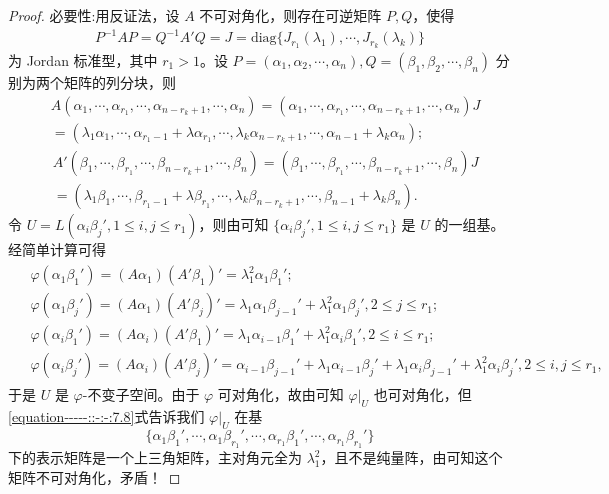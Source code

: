 \documentclass[../../main.tex]{subfiles}%
\begin{document}
\begin{proof}
{\heiti 必要性:}用反证法，设 $A$ 不可对角化，则存在可逆矩阵 $P,Q$，使得
\begin{align*}
P^{-1}AP = Q^{-1}A'Q = J = \mathrm{diag}\{J_{r_1}(\lambda_1),\cdots,J_{r_k}(\lambda_k)\}
\end{align*}
为 Jordan 标准型，其中 $r_1 > 1$。设 $P = (\alpha_1,\alpha_2,\cdots,\alpha_n),Q = (\beta_1,\beta_2,\cdots,\beta_n)$ 分别为两个矩阵的列分块，则
\begin{align*}
&A\left( \alpha _1,\cdots ,\alpha _{r_1},\cdots ,\alpha _{n-r_k+1},\cdots ,\alpha _n \right) =\left( \alpha _1,\cdots ,\alpha _{r_1},\cdots ,\alpha _{n-r_k+1},\cdots ,\alpha _n \right) J
\\
&=\left( \lambda _1\alpha _1,\cdots ,\alpha _{r_1-1}+\lambda \alpha _{r_1},\cdots ,\lambda _k\alpha _{n-r_k+1},\cdots ,\alpha _{n-1}+\lambda _k\alpha _n \right) ;
\end{align*}
\begin{align*}
&A'\left( \beta _1,\cdots ,\beta _{r_1},\cdots ,\beta _{n-r_k+1},\cdots ,\beta _n \right) =\left( \beta _1,\cdots ,\beta _{r_1},\cdots ,\beta _{n-r_k+1},\cdots ,\beta _n \right) J
\\
&=\left( \lambda _1\beta _1,\cdots ,\beta _{r_1-1}+\lambda \beta _{r_1},\cdots ,\lambda _k\beta _{n-r_k+1},\cdots ,\beta _{n-1}+\lambda _k\beta _n \right) .
\end{align*}
令 $U = L(\alpha_i\beta_j',1\leqslant  i,j\leqslant  r_1)$，则由可知 $\{\alpha_i\beta_j',1\leqslant  i,j\leqslant  r_1\}$ 是 $U$ 的一组基。经简单计算可得
\begin{gather}\label{equation-----::-:-:7.8}
\begin{aligned}
&\varphi (\alpha _1\beta _1')=\left( A\alpha _1 \right) \left( A'\beta _1 \right) '=\lambda _{1}^{2}\alpha _1\beta _1';
\\
&\varphi (\alpha _1\beta _j')=\left( A\alpha _1 \right) \left( A'\beta _j \right) '=\lambda _1\alpha _1\beta _{j-1}'+\lambda _{1}^{2}\alpha _1\beta _j', 2\leqslant j\leqslant r_1;
\\
&\varphi (\alpha _i\beta _1')=\left( A\alpha _i \right) \left( A'\beta _1 \right) '=\lambda _1\alpha _{i-1}\beta _1'+\lambda _{1}^{2}\alpha _i\beta _1', 2\leqslant i\leqslant r_1;
\\
&\varphi (\alpha _i\beta _j')=\left( A\alpha _i \right) \left( A'\beta _j \right) '=\alpha _{i-1}\beta _{j-1}'+\lambda _1\alpha _{i-1}\beta _j'+\lambda _1\alpha _i\beta _{j-1}'+\lambda _{1}^{2}\alpha _i\beta _j', 2\leqslant i,j\leqslant r_1,
\end{aligned}
\end{gather}
于是 $U$ 是 $\varphi$-不变子空间。由于 $\varphi$ 可对角化，故由可知 $\varphi|_U$ 也可对角化，但\eqref{equation-----::-:-:7.8}式告诉我们 $\varphi|_U$ 在基 $$\{\alpha_1\beta_1',\cdots,\alpha_1\beta_{r_1}',\cdots,\alpha_{r_1}\beta_1',\cdots,\alpha_{r_1}\beta_{r_1}'\}$$ 下的表示矩阵是一个上三角矩阵，主对角元全为 $\lambda_1^2$，且不是纯量阵，由可知这个矩阵不可对角化，矛盾！

\end{proof}
\end{document}
